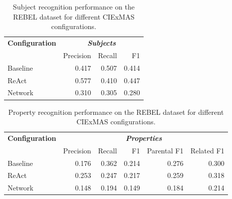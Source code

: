 \documentclass[a4paper,oneside,bibliography=totoc]{scrbook}
\begin{document}
\begin{table}[h]
  \centering
  \begin{tabular}{l|rrr}
    \toprule
    \textbf{Configuration} & \multicolumn{3}{c}{\textit{\textbf{Subjects}}}                  \\
                           & Precision                                      & Recall & F1    \\
    \midrule
    Baseline               & 0.417                                          & 0.507  & 0.414 \\
    ReAct                  & 0.577                                          & 0.410  & 0.447 \\
    Network                & 0.310                                          & 0.305  & 0.280 \\
    \bottomrule
  \end{tabular}
  \caption{Subject recognition performance on the REBEL dataset for different CIExMAS configurations.}
  \label{tab:rebel_subjects}
\end{table}

\begin{table}[h]
  \centering
  \begin{tabular}{l|rrrrr}
    \toprule
    \textbf{Configuration} & \multicolumn{5}{c}{\textit{\textbf{Properties}}}                                             \\
                           & Precision                                        & Recall & F1    & Parental F1 & Related F1 \\
    \midrule
    Baseline               & 0.176                                            & 0.362  & 0.214 & 0.276       & 0.300      \\
    ReAct                  & 0.253                                            & 0.247  & 0.217 & 0.259       & 0.318      \\
    Network                & 0.148                                            & 0.194  & 0.149 & 0.184       & 0.214      \\
    \bottomrule
  \end{tabular}
  \caption{Property recognition performance on the REBEL dataset for different CIExMAS configurations.}
  \label{tab:rebel_properties}
\end{table}
\end{document}
